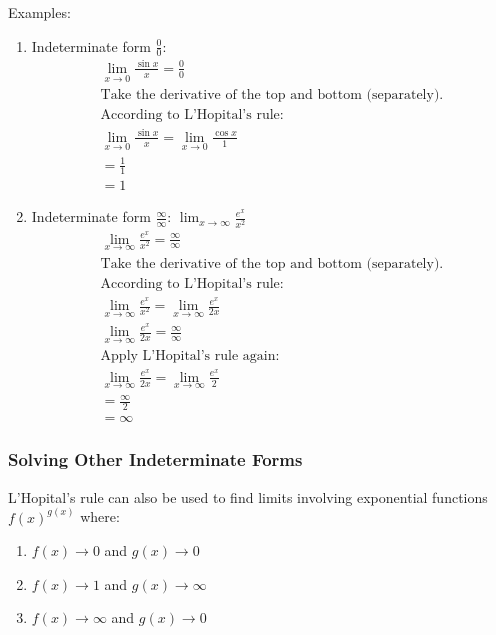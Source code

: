 \documentclass[12pt]{article}
\begin{document}
\noindent Examples:
\begin{enumerate}
    \item Indeterminate form $\frac{0}{0}$:
          \begin{gather*}
              \lim_{x \to 0} \frac{\sin{x}}{x} = \frac{0}{0} \\[6pt]
              \text{Take the derivative of the top and bottom (separately).}\\
              \text{According to L'Hopital's rule:} \\
              \lim_{x \to 0} \frac{\sin{x}}{x} = \lim_{x \to 0} \frac{\cos{x}}{1} \\[6pt]
              = \frac{1}{1} \\[6pt]
              = 1
          \end{gather*}

    \item Indeterminate form $\frac{\infty}{\infty}$: $\lim_{x \to \infty} \frac{e^x}{x^2}$
          \begin{gather*}
              \lim_{x \to \infty} \frac{e^x}{x^2} = \frac{\infty}{\infty} \\[6pt]
              \text{Take the derivative of the top and bottom (separately).}\\
              \text{According to L'Hopital's rule:} \\
              \lim_{x \to \infty} \frac{e^x}{x^2} = \lim_{x \to \infty} \frac{e^x}{2x} \\[6pt]
              \lim_{x \to \infty} \frac{e^x}{2x} = \frac{\infty}{\infty} \\[6pt]
              \text{Apply L'Hopital's rule again:} \\
              \lim_{x \to \infty} \frac{e^x}{2x} = \lim_{x \to \infty} \frac{e^x}{2} \\[6pt]
              = \frac{\infty}{2} \\[6pt]
              = \infty
          \end{gather*}
\end{enumerate}

\subsubsection{Solving Other Indeterminate Forms}

L'Hopital's rule can also be used to find limits involving exponential functions $f(x)^{g(x)}$ where:

\begin{enumerate}
    \item $f(x) \to 0$ and $g(x) \to 0$
    \item $f(x) \to 1$ and $g(x) \to \infty$
    \item $f(x) \to \infty$ and $g(x) \to 0$
\end{enumerate}
\end{document}
